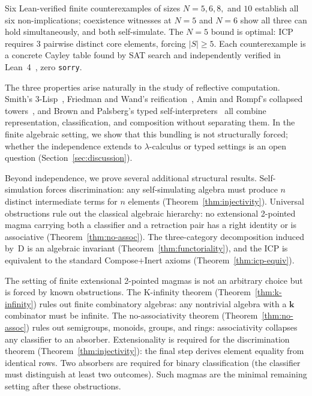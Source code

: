\documentclass[sigconf,screen]{acmart}
\theoremstyle{remark}
\begin{document}
Six Lean-verified finite counterexamples of sizes $N\!=\!5, 6, 8,$ and $10$ establish all six non-implications; coexistence witnesses at $N\!=\!5$ and $N\!=\!6$ show all three can hold simultaneously, and both self-simulate. The $N\!=\!5$ bound is optimal: ICP requires 3 pairwise distinct core elements, forcing $|S| \geq 5$. Each counterexample is a concrete Cayley table found by SAT search and independently verified in Lean~4~\cite{moura21}, zero \texttt{sorry}.

The three properties arise naturally in the study of reflective computation. Smith's 3-Lisp~\cite{smith84}, Friedman and Wand's reification~\cite{friedman84}, Amin and Rompf's collapsed towers~\cite{amin18}, and Brown and Palsberg's typed self-interpreters~\cite{brown16} all combine representation, classification, and composition without separating them. In the finite algebraic setting, we show that this bundling is not structurally forced; whether the independence extends to $\lambda$-calculus or typed settings is an open question (Section~\ref{sec:discussion}).

Beyond independence, we prove several additional structural results. Self-simulation forces discrimination: any self-simulating algebra must produce $n$ distinct intermediate terms for $n$ elements (Theorem~\ref{thm:injectivity}). Universal obstructions rule out the classical algebraic hierarchy: no extensional 2-pointed magma carrying both a classifier and a retraction pair has a right identity or is associative (Theorem~\ref{thm:no-assoc}). The three-category decomposition induced by~D is an algebraic invariant (Theorem~\ref{thm:functoriality}), and the ICP is equivalent to the standard Compose+Inert axioms (Theorem~\ref{thm:icp-equiv}).

The setting of finite extensional 2-pointed magmas is not an arbitrary choice but is forced by known obstructions. The K-infinity theorem (Theorem~\ref{thm:k-infinity}) rules out finite combinatory algebras: any nontrivial algebra with a $\mathbf{k}$ combinator must be infinite. The no-associativity theorem (Theorem~\ref{thm:no-assoc}) rules out semigroups, monoids, groups, and rings: associativity collapses any classifier to an absorber. Extensionality is required for the discrimination theorem (Theorem~\ref{thm:injectivity}): the final step derives element equality from identical rows. Two absorbers are required for binary classification (the classifier must distinguish at least two outcomes). Such magmas are the minimal remaining setting after these obstructions.
\end{document}
